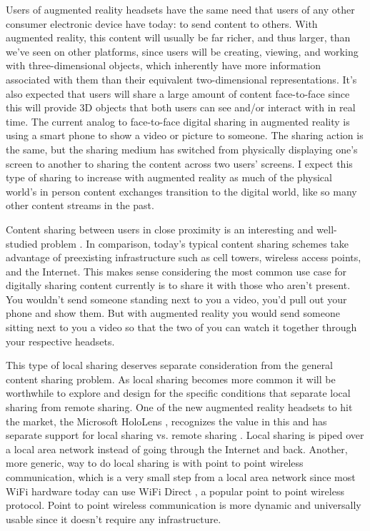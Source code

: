 \documentclass[12pt]{report}
\begin{document}
Users of augmented reality headsets have the same need that users of any other consumer electronic device have today: to send content to others. With augmented reality, this content will usually be far richer, and thus larger, than we've seen on other platforms, since users will be creating, viewing, and working with three-dimensional objects, which inherently have more information associated with them than their equivalent two-dimensional representations. It's also expected that users will share a large amount of content face-to-face since this will provide 3D objects that both users can see and/or interact with in real time. The current analog to face-to-face digital sharing in augmented reality is using a smart phone to show a video or picture to someone. The sharing action is the same, but the sharing medium has switched from physically displaying one's screen to another to sharing the content across two users' screens. I expect this type of sharing to increase with augmented reality as much of the physical world's in person content exchanges transition to the digital world, like so many other content streams in the past. \par

Content sharing between users in close proximity is an interesting and well-studied problem \cite{TalkingToStrangersSmetters2002,P2pMobileSocialContentSharingQureshi2010,CarTorrentLee2007,P2pFileSharingMobileAdHocKlemm2003,VanetcodeVehicularNetworkCodingShabbir2006,CodeTorrentVanetLee2006,AdHocSharingSystemPatentVan2006}. In comparison, today's typical content sharing schemes take advantage of preexisting infrastructure such as cell towers, wireless access points, and the Internet. This makes sense considering the most common use case for digitally sharing content currently is to share it with those who aren't present. You wouldn't send someone standing next to you a video, you'd pull out your phone and show them. But with augmented reality you would send someone sitting next to you a video so that the two of you can watch it together through your respective headsets. \par

This type of local sharing deserves separate consideration from the general content sharing problem. As local sharing becomes more common it will be worthwhile to explore and design for the specific conditions that separate local sharing from remote sharing. One of the new augmented reality headsets to hit the market, the Microsoft HoloLens \cite{HoloLensWebsite}, recognizes the value in this and has separate support for local sharing vs. remote sharing \cite{HoloLensSharingLocalNetwork2016}. Local sharing is piped over a local area network instead of going through the Internet and back. Another, more generic, way to do local sharing is with point to point wireless communication, which is a very small step from a local area network since most WiFi hardware today can use WiFi Direct \cite{WiFiDirectP2p2014}, a popular point to point wireless protocol. Point to point wireless communication is more dynamic and universally usable since it doesn't require any infrastructure. \par
\end{document}
